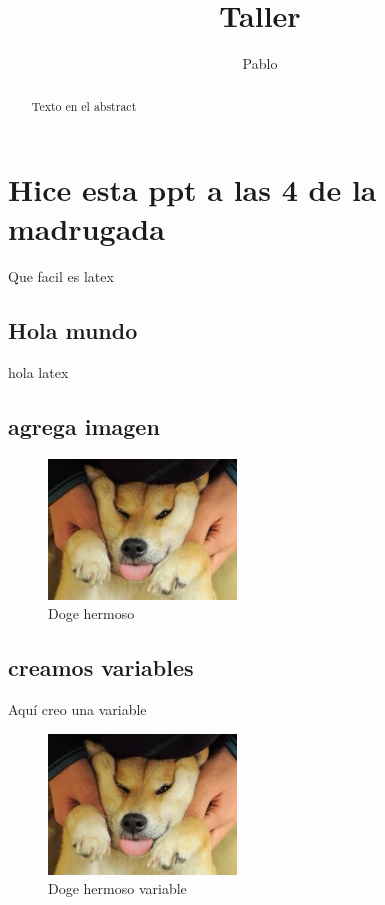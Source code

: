 \documentclass[]{article}
\title{Taller}
\author{Pablo}
\begin{document}
\maketitle

\begin{abstract}
	
	Texto en el abstract

\end{abstract}

\section{Hice esta ppt a las 4 de la madrugada}

Que facil es latex

\subsection{Hola mundo}

hola latex

\subsection{agrega imagen}

\begin{figure}[H]
	\centering
	\includegraphics[width=5cm]{doge.jpg}
	\caption{Doge hermoso}
	\label{doge}
\end{figure}

\subsection{creamos variables}

Aquí creo una variable
\def\dogesize {5cm}

\begin{figure}[H]
	\centering
	\includegraphics[width=\dogesize]{doge.jpg}
	\caption{Doge hermoso variable}
\end{figure}
\end{document}
